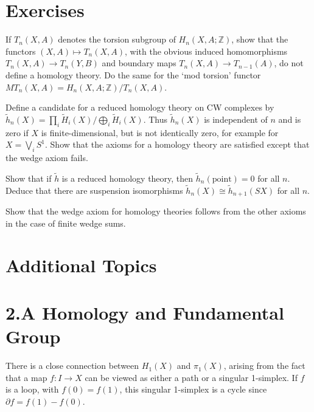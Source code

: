 \section*{Exercises}

\begin{exercise}
If $T_n(X, A)$ denotes the torsion subgroup of $H_n(X, A; \mathbb{Z})$, show that the functors $(X, A) \mapsto T_n(X, A)$, with the obvious induced homomorphisms $T_n(X, A) \to T_n(Y, B)$ and boundary maps $T_n(X, A) \to T_{n-1}(A)$, do not define a homology theory. Do the same for the `mod torsion' functor $MT_n(X, A) = H_n(X, A; \mathbb{Z})/T_n(X, A)$.
\end{exercise}

\begin{exercise}
Define a candidate for a reduced homology theory on CW complexes by $\tilde{h}_n(X) = \prod_i \tilde{H}_i(X) / \bigoplus_i \tilde{H}_i(X)$. Thus $\tilde{h}_n(X)$ is independent of $n$ and is zero if $X$ is finite-dimensional, but is not identically zero, for example for $X = \bigvee_i S^1$. Show that the axioms for a homology theory are satisfied except that the wedge axiom fails.
\end{exercise}

\begin{exercise}
Show that if $\tilde{h}$ is a reduced homology theory, then $\tilde{h}_n(\text{point}) = 0$ for all $n$. Deduce that there are suspension isomorphisms $\tilde{h}_n(X) \cong \tilde{h}_{n+1}(SX)$ for all $n$.
\end{exercise}

\begin{exercise}
Show that the wedge axiom for homology theories follows from the other axioms in the case of finite wedge sums.
\end{exercise}

\section*{Additional Topics}

\section{2.A Homology and Fundamental Group}

There is a close connection between $H_1(X)$ and $\pi_1(X)$, arising from the fact that a map $f:I \to X$ can be viewed as either a path or a singular 1-simplex. If $f$ is a loop, with $f(0) = f(1)$, this singular 1-simplex is a cycle since $\partial f = f(1) - f(0)$.

